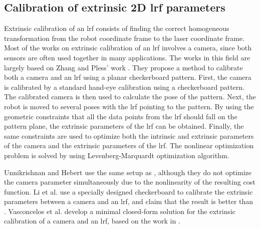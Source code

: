 \subsection{Calibration of extrinsic 2D \ac{lrf} parameters}
\label{sec:laser_calib}
Extrinsic calibration of an \ac{lrf} consists of finding the correct homogeneous transformation from the robot coordinate frame to the laser coordinate frame. Most of the works on extrinsic calibration of an \ac{lrf} involves a camera, since both sensors are often used together in many applications. The works in this field are largely based on Zhang and Pless' work \cite{Zhang2004}. They propose a method to calibrate both a camera and an \ac{lrf} using a planar checkerboard pattern. First, the camera is calibrated by a standard hand-eye calibration  \cite{BouguetJ.Y.2003} using a checkerboard pattern. The calibrated camera is then used to calculate the pose of the pattern. Next, the robot is moved to several poses with the \ac{lrf} pointing to the pattern. By using the geometric constraints that all the data points from the \ac{lrf} should fall on the pattern plane, the extrinsic parameters of the \ac{lrf} can be obtained. Finally, the same constraints are used to optimize both the intrinsic and extrinsic parameters of the camera and the extrinsic parameters of the \ac{lrf}. The nonlinear optimization problem is solved by using Levenberg-Marquardt optimization algorithm.

Unnikrishnan and Hebert \cite{Unnikrishnan2005} use the same setup as \cite{Zhang2004}, although they do not optimize the camera parameter simultaneously due to the nonlinearity of the resulting cost function. 
Li et al. \cite{Li2007} use a specially designed checkerboard to calibrate the extrinsic parameters between a camera and an \ac{lrf}, and claim that the result is better than \cite{Zhang2004}. Vasconcelos et al. \cite{Vasconcelos2012} develop a minimal closed-form solution for the extrinsic calibration of a camera and an \ac{lrf}, based on the work in \cite{Zhang2004}. 


